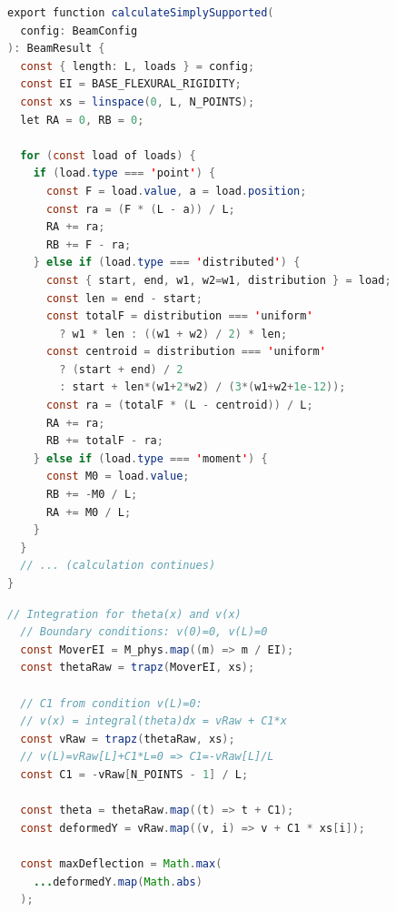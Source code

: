 \begin{lstlisting}[language=Java,caption={Определение реакций опор (фрагмент)}]
export function calculateSimplySupported(
  config: BeamConfig
): BeamResult {
  const { length: L, loads } = config;
  const EI = BASE_FLEXURAL_RIGIDITY;
  const xs = linspace(0, L, N_POINTS);
  let RA = 0, RB = 0;

  for (const load of loads) {
    if (load.type === 'point') {
      const F = load.value, a = load.position;
      const ra = (F * (L - a)) / L;
      RA += ra;
      RB += F - ra;
    } else if (load.type === 'distributed') {
      const { start, end, w1, w2=w1, distribution } = load;
      const len = end - start;
      const totalF = distribution === 'uniform'
        ? w1 * len : ((w1 + w2) / 2) * len;
      const centroid = distribution === 'uniform'
        ? (start + end) / 2
        : start + len*(w1+2*w2) / (3*(w1+w2+1e-12));
      const ra = (totalF * (L - centroid)) / L;
      RA += ra;
      RB += totalF - ra;
    } else if (load.type === 'moment') {
      const M0 = load.value;
      RB += -M0 / L;
      RA += M0 / L;
    }
  }
  // ... (calculation continues)
}
\end{lstlisting}

\begin{lstlisting}[language=Java,caption={Численное интегрирование для деформаций}]
  // Integration for theta(x) and v(x)
  // Boundary conditions: v(0)=0, v(L)=0
  const MoverEI = M_phys.map((m) => m / EI);
  const thetaRaw = trapz(MoverEI, xs);

  // C1 from condition v(L)=0:
  // v(x) = integral(theta)dx = vRaw + C1*x
  const vRaw = trapz(thetaRaw, xs);
  // v(L)=vRaw[L]+C1*L=0 => C1=-vRaw[L]/L
  const C1 = -vRaw[N_POINTS - 1] / L;

  const theta = thetaRaw.map((t) => t + C1);
  const deformedY = vRaw.map((v, i) => v + C1 * xs[i]);

  const maxDeflection = Math.max(
    ...deformedY.map(Math.abs)
  );
\end{lstlisting}


